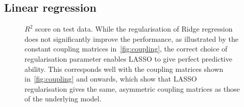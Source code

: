\documentclass[11pt,british,a4paper]{article}
\numberwithin{equation}{section}
\begin{document}
\subsection{Linear regression}
\begin{figure}[H]
    \centering
    \caption{\(R^2\) score on test data. While the regularisation of Ridge regression does not significantly improve the performance, as illustrated by the constant coupling matrices in~\vref{fig:coupling}, the correct choice of regularisation parameter enables LASSO to give perfect predictive ability. This corresponds well with the coupling matrices shown in~\ref{fig:coupling} and onwards, which show that LASSO regularisation gives the same, asymmetric coupling matrices as those of the underlying model.}\label{fig:r2}
\end{figure}
\end{document}
